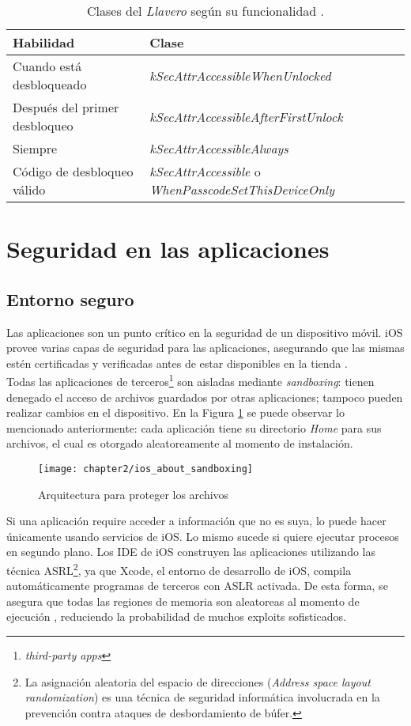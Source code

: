 \begin{table}[hbtp]
    \centering
    \begin{tabular}{l l}
\textbf{Habilidad}    &    \textbf{Clase}   \\ \hline
Cuando est\'a desbloqueado    &   \textit{kSecAttrAccessibleWhenUnlocked} \\
Despu\'es del primer desbloqueo    &    \textit{kSecAttrAccessibleAfterFirstUnlock} \\
Siempre    &   \textit{kSecAttrAccessibleAlways}    \\
C\'odigo de desbloqueo v\'alido    &    \textit{kSecAttrAccessible} o \textit{WhenPasscodeSetThisDeviceOnly}
    \end{tabular}
    \caption{Clases del \textit{Llavero} seg\'un su funcionalidad \cite{asg}.}
    \label{tab:ch02:keychain-classes}
\end{table}
\section{Seguridad en las aplicaciones}
\subsection{Entorno seguro}
Las aplicaciones son un punto crítico en la seguridad de un dispositivo móvil. iOS provee varias capas de seguridad para las aplicaciones, asegurando que las mismas estén certificadas y verificadas antes de estar disponibles en la tienda \cite{asg}.\\
Todas las aplicaciones de terceros\footnote{\textit{third-party apps}} son aisladas mediante \textit{sandboxing}: tienen denegado el acceso de archivos guardados por otras aplicaciones; tampoco pueden realizar cambios en el dispositivo. En la Figura \ref{fig:ch02:sandboxing} se puede observar lo mencionado anteriormente: cada aplicaci\'on tiene su directorio \textit{Home} para sus archivos, el cual es otorgado aleatoreamente al momento de instalaci\'on.\\
\begin{figure}[hbtp]
	\centering
	\texttt{[image: chapter2/ios\_about\_sandboxing]}
    \caption{Arquitectura para proteger los archivos \cite{developerapple}} 
    \label{fig:ch02:sandboxing}
\end{figure}
Si una aplicaci\'on require acceder a información que no es suya, lo puede hacer únicamente usando servicios de iOS. Lo mismo sucede si quiere ejecutar procesos en segundo plano.
Los IDE de iOS construyen las aplicaciones utilizando las técnica ASRL\footnote{La asignación aleatoria del espacio de direcciones (\textit{Address space layout randomization}) es una técnica de seguridad informática involucrada en la prevención contra ataques de desbordamiento de búfer.}, ya que Xcode, el entorno de desarrollo de iOS, compila automáticamente programas de terceros con ASLR activada. De esta forma, se asegura que todas las regiones de memoria son aleatoreas al momento de ejecución \cite{asg}, reduciendo la probabilidad de muchos exploits sofisticados.
